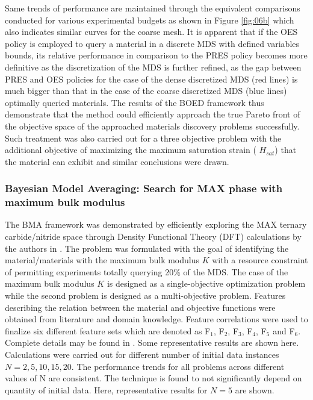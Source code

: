 \documentclass[utf8]{frontiersSCNS} %
\begin{document}
Same trends of performance are maintained through the equivalent comparisons conducted for various experimental budgets as shown  in Figure \ref{fig:06b} which also indicates similar curves for the coarse mesh. It is apparent that if the OES policy is employed to query a material in a discrete MDS with defined variables bounds, its relative performance in comparison to the PRES policy becomes more definitive as the discretization of the MDS is further refined, as the gap between PRES and OES policies for the case of the dense discretized MDS (red lines) is much bigger than that in the case of the coarse discretized MDS (blue lines) optimally queried materials. The results of the BOED framework thus demonstrate that the method could efficiently approach the true Pareto front of the objective space of the approached materials discovery problems successfully. Such treatment was also carried out for a three objective problem with the additional objective of maximizing the maximum 
saturation strain ( $H_{sat}$) that the material can exhibit and similar conclusions were drawn.


\subsubsection{ Bayesian Model Averaging: Search for MAX phase with maximum bulk modulus}
The BMA framework was demonstrated by efficiently exploring the MAX ternary carbide/nitride space through Density Functional Theory (DFT) calculations by the authors in \cite{talapatra2018autonomous}.  The problem was formulated with the goal of identifying the material/materials with the maximum bulk modulus $K$ with a resource constraint of permitting experiments totally querying 20\% of the MDS. The case of the maximum bulk modulus $K$ is designed as a single-objective optimization problem while the second problem is designed as a multi-objective problem. Features describing the relation between the material and objective functions were obtained from literature and domain knowledge. Feature correlations were used to finalize six different feature sets which are denoted as F$_1$, F$_2$, F$_3$, F$_4$, F$_5$ and F$_6$. Complete details may be found in \cite{talapatra2018autonomous}. Some representative results are shown here.  Calculations were carried out for different number of initial data instances $N  = 2,  5,  10,  15,  2$0. The performance trends for all problems across different values of N  are consistent. The technique is found to not significantly depend on quantity of initial data. Here, representative results for $N = 5$ are shown. 
\end{document}
